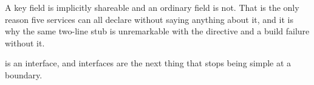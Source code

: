 A key field is implicitly shareable and an ordinary field is not. That is the
only reason five services can all declare  without saying
anything about it, and it is why the same two-line stub is unremarkable with the
directive and a build failure without it.

\medskip
{} is an interface, and interfaces are the next thing that stops being
simple at a boundary.

%
